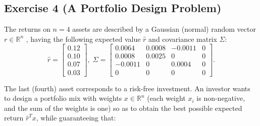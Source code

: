 \documentclass[11pt]{article}
\begin{document}
\begin{solution}
\end{solution}

\newpage
\subsection*{Exercise 4 (A Portfolio Design Problem)}

The returns on $n = 4$ assets are described by a Gaussian (normal) random vector $r \in \mathbb{R}^n$ , having the following expected value $\hat{r}$ and covariance matrix $\Sigma$:
\[
\hat{r} =
\begin{bmatrix}
    0.12  \\
    0.10  \\
    0.07 \\
    0.03

\end{bmatrix}, \; \Sigma =
\begin{bmatrix}
    0.0064 & 0.0008 & -0.0011  & 0 \\
    0.0008 & 0.0025 & 0  & 0 \\
    -0.0011 & 0 & 0.0004  & 0 \\
    0 & 0 & 0  & 0

\end{bmatrix}
.
\]


The last (fourth) asset corresponds to a risk-free investment. An investor
wants to design a portfolio mix with weights $x \in \mathbb{R}^n$ (each weight $x_i$
is non-negative, and the sum of the weights is one) so as to obtain the best possible expected return $\hat{r}^Tx$, while guaranteeing that: \\
\end{document}
